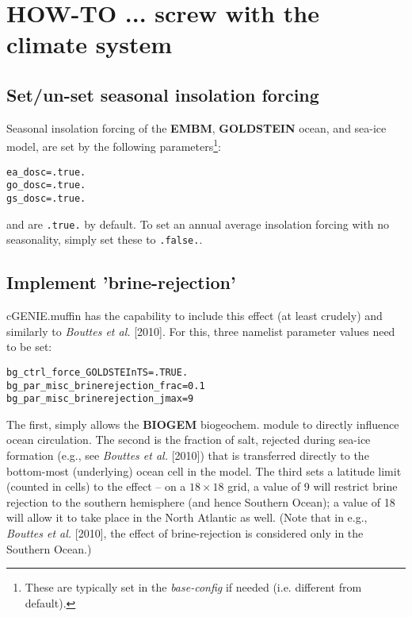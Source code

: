 \documentclass[11pt,fleqn]{book} %
\begin{document}

\newpage


\section{HOW-TO ... screw with the climate system}
\vspace{2mm}

%
\subsection*{Set/un-set seasonal insolation forcing}

\vspace{1mm}
Seasonal insolation forcing of the \textbf{EMBM}, \textbf{GOLDSTEIN} ocean, and sea-ice model, are set by the following parameters\footnote{These are typically set in the \textit{base-config} if needed (i.e. different from default).}:
\vspace{-1mm}\begin{verbatim}
ea_dosc=.true.
go_dosc=.true.
gs_dosc=.true.
\end{verbatim}\vspace{-1mm}
and are \texttt{.true.} by default.
To set an annual average insolation forcing with no seasonality, simply set these to \texttt{.false.}.

%
\subsection*{Implement 'brine-rejection'}

cGENIE.muffin has the capability to include this effect (at least crudely) and similarly to \textit{Bouttes et al.} [2010]. For this, three namelist parameter values need to be set:

\vspace{-2mm}\begin{verbatim}
bg_ctrl_force_GOLDSTEInTS=.TRUE.
bg_par_misc_brinerejection_frac=0.1
bg_par_misc_brinerejection_jmax=9
\end{verbatim}\vspace{-2mm}

The first, simply allows the \textbf{BIOGEM} biogeochem. module to directly influence ocean circulation. The second is the fraction of salt, rejected during sea-ice formation (e.g., see \textit{Bouttes et al.} [2010]) that is transferred directly to the bottom-most (underlying) ocean cell in the model. The third sets a latitude limit (counted in cells) to the effect -- on a \(18\times18\) grid, a value of 9 will restrict brine rejection to the southern hemisphere (and hence Southern Ocean); a value of 18 will allow it to take  place in the North Atlantic as well. (Note that in e.g., \textit{Bouttes et al.} [2010], the effect of brine-rejection is considered only in the Southern Ocean.)
\end{document}
